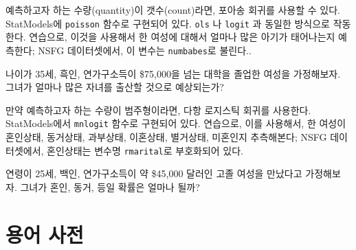 \begin{exercise}
예측하고자 하는 수량(quantity)이 갯수(count)라면, 포아송 회귀를 사용할 수 있다.
StatModels에 {\tt poisson} 함수로 구현되어 있다.
{\tt ols} 나 {\tt logit} 과 동일한 방식으로 작동한다.
연습으로, 이것을 사용해서 한 여성에 대해서 얼마나 많은 아기가 태어나는지 예측한다;
NSFG 데이터셋에서, 이 변수는 {\tt numbabes}로 불린다..

나이가 35세, 흑인, 연가구소득이 \$75,000을 넘는 대학을 졸업한 여성을 가정해보자.
그녀가 얼마나 많은 자녀를 출산할 것으로 예상되는가?
\end{exercise}


\begin{exercise}
만약 예측하고자 하는 수량이 범주형이라면, 
다항 로지스틱 회귀를 사용한다.
StatModels에서 {\tt mnlogit} 함수로 구현되어 있다.
연습으로, 이를 사용해서, 한 여성이 혼인상태, 동거상태, 과부상태,
이혼상태, 별거상태, 미혼인지 추측해본다;
NSFG 데이터셋에서, 혼인상태는 변수명 {\tt rmarital}로 부호화되어 있다.


연령이 25세, 백인, 연가구소득이 약 \$45,000 달러인 고졸 여성을 만났다고 가정해보자.
그녀가 혼인, 동거, 등일 확률은 얼마나 될까?

\end{exercise}


\section{용어 사전}

